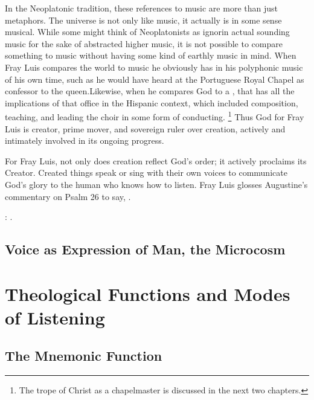 In the Neoplatonic tradition, these references to music are more than just metaphors.
The universe is not only like music, it actually is in some sense musical.
While some might think of Neoplatonists as ignorin actual sounding music for the sake of abstracted higher music, it is not possible to compare something to music without having some kind of earthly music in mind.
When Fray Luis compares the world to music  he obviously has in his  polyphonic music of his own time, such as he would have heard at the Portuguese Royal Chapel as confessor to the queen.
Likewise, when he compares God to a , that has all the implications of that office in the Hispanic context, which included composition, teaching, and leading the choir in some form of conducting.%
  \footnote{The trope of Christ as a chapelmaster is discussed in the next two chapters.}
Thus God for Fray Luis is creator, prime mover, and sovereign ruler over creation, actively and intimately involved in its ongoing progress.

For Fray Luis, not only does creation reflect God's order; it actively proclaims its Creator.
Created things speak or sing with their own voices to communicate God's glory to the human who knows how to listen.
Fray Luis glosses Augustine's commentary on Psalm 26 to say, .%
  \begin{Footnote}
  \Autocite[185]{LuisdeGranada:Simbolo}: .
  \end{Footnote}

\subsection{Voice as Expression of Man, the Microcosm}


\section{Theological Functions and Modes of Listening}

\subsection{The Mnemonic Function}

